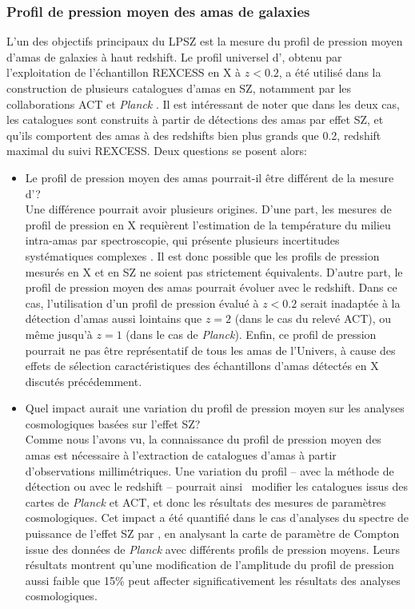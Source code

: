 \subsubsection{Profil de pression moyen des amas de galaxies} %
L'un des objectifs principaux du LPSZ est la mesure du profil de pression moyen d'amas de galaxies à haut redshift.
Le profil universel d', obtenu par l'exploitation de l'échantillon REXCESS en X à $z < 0.2$, a été utilisé dans la construction de plusieurs catalogues d'amas en SZ, notamment par les collaborations ACT \cite{hilton_atacama_2021} et \textit{Planck} \cite{planck_collaboration_planck_2016-2}.
Il est intéressant de noter que dans les deux cas, les catalogues sont construits à partir de détections des amas par effet SZ, et qu'ils comportent des amas à des redshifts bien plus grands que 0.2, redshift maximal du suivi REXCESS.
Deux questions se posent alors:
\begin{itemize}[leftmargin=*]
\setlength\itemsep{5pt}
\item
    Le profil de pression moyen des amas pourrait-il être différent de la mesure d'\citeauthor{arnaud_universal_2010}? \\
    Une différence pourrait avoir plusieurs origines.
    D'une part, les mesures de profil de pression en X requièrent l'estimation de la température du milieu intra-amas par spectroscopie, qui présente plusieurs incertitudes systématiques complexes \cite{bohringer_x-ray_2010}.
    Il est donc possible que les profils de pression mesurés en X et en SZ ne soient pas strictement équivalents.
    D'autre part, le profil de pression moyen des amas pourrait évoluer avec le redshift.
    Dans ce cas, l'utilisation d'un profil de pression évalué à $z < 0.2$ serait inadaptée à la détection d'amas aussi lointains que $z=2$ (dans le cas du relevé ACT), ou même jusqu'à $z=1$ (dans le cas de \textit{Planck}).
    Enfin, ce profil de pression pourrait ne pas être représentatif de tous les amas de l'Univers, à cause des effets de sélection caractéristiques des échantillons d'amas détectés en X discutés précédemment.
\item
Quel impact aurait une variation du profil de pression moyen sur les analyses cosmologiques basées sur l'effet SZ? \\
    Comme nous l'avons vu, la connaissance du profil de pression moyen des amas est nécessaire à l'extraction de catalogues d'amas à partir d'observations millimétriques.
    Une variation du profil -- avec la méthode de détection ou avec le redshift -- pourrait ainsi \prior\ modifier les catalogues issus des cartes de \textit{Planck} et ACT, et donc les résultats des mesures de paramètres cosmologiques.
    Cet impact a été quantifié dans le cas d'analyses du spectre de puissance de l'effet SZ par , en analysant la carte de paramètre de Compton issue des données de \textit{Planck} \cite{planck_collaboration_planck_2016} avec différents profils de pression moyens.
    Leurs résultats montrent qu'une modification de l'amplitude du profil de pression aussi faible que 15\% peut affecter significativement les résultats des analyses cosmologiques.
\end{itemize}

